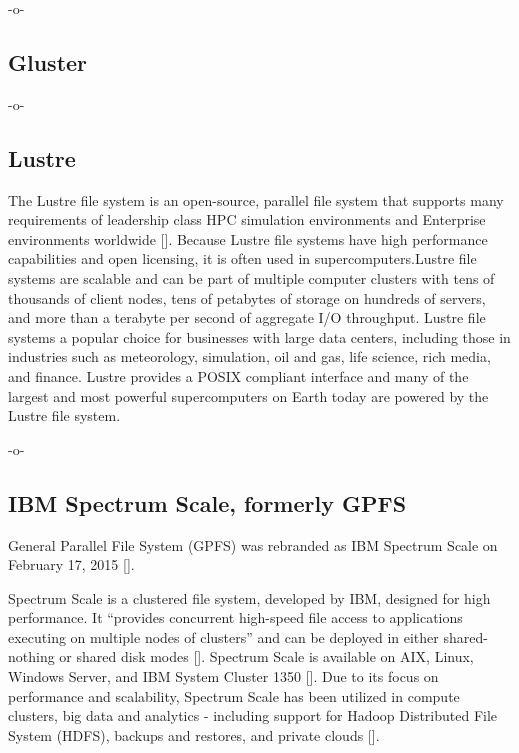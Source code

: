      -o-

\subsection{Gluster}

-o- 

\subsection{Lustre}

The Lustre file system is an open-source, parallel file system that
supports many requirements of leadership class HPC simulation
environments and Enterprise environments
worldwide [\cite{www-lustre}]. Because Lustre file systems have high
performance capabilities and open licensing, it is often used in
supercomputers.Lustre file systems are scalable and can be part of
multiple computer clusters with tens of thousands of client nodes,
tens of petabytes of storage on hundreds of servers, and more than a
terabyte per second of aggregate I/O throughput. Lustre file systems a
popular choice for businesses with large data centers, including those
in industries such as meteorology, simulation, oil and gas, life
science, rich media, and finance. Lustre provides a POSIX compliant
interface and many of the largest and most powerful supercomputers on
Earth today are powered by the Lustre file system.

     -o-
     
\subsection{IBM Spectrum Scale, formerly GPFS}

General Parallel File System (GPFS) was rebranded as IBM Spectrum
Scale on February 17, 2015 [\cite{www-wikigpfs}].

Spectrum Scale is a clustered file system, developed by IBM, designed
for high performance. It ``provides concurrent high-speed file access
to applications executing on multiple nodes of clusters'' and can be
deployed in either shared-nothing or shared disk
modes [\cite{www-wikigpfs}].  Spectrum Scale is available on AIX, Linux,
Windows Server, and IBM System Cluster 1350 [\cite{www-wikigpfs}].  Due
to its focus on performance and scalability, Spectrum Scale has been
utilized in compute clusters, big data and analytics - including
support for Hadoop Distributed File System (HDFS), backups and
restores, and private clouds [\cite{www-spectrumscale}].

